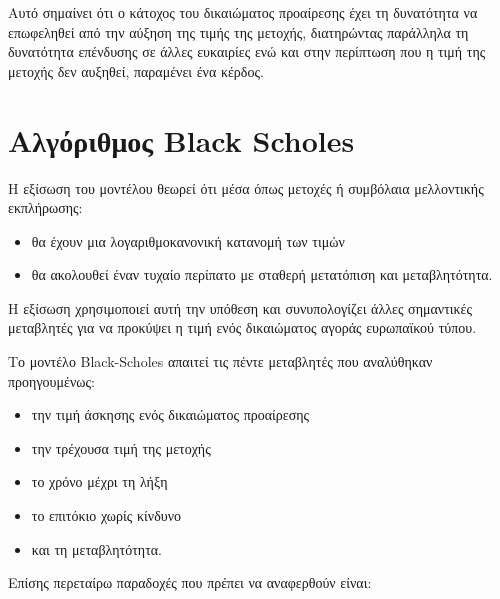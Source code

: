 Αυτό σημαίνει ότι ο κάτοχος του δικαιώματος προαίρεσης έχει τη δυνατότητα να επωφεληθεί από την αύξηση της τιμής της μετοχής, διατηρώντας παράλληλα τη δυνατότητα επένδυσης σε άλλες ευκαιρίες
ενώ και στην περίπτωση που η τιμή της μετοχής δεν αυξηθεί, παραμένει ένα κέρδος.

\section{Αλγόριθμος Black Scholes}

H εξίσωση του μοντέλου θεωρεί ότι μέσα όπως μετοχές ή συμβόλαια μελλοντικής εκπλήρωσης:
\begin{itemize}
    \item θα έχουν μια λογαριθμοκανονική κατανομή των τιμών
    \item θα ακολουθεί έναν τυχαίο περίπατο με σταθερή μετατόπιση και μεταβλητότητα.
\end{itemize}

Η εξίσωση χρησιμοποιεί αυτή την υπόθεση και συνυπολογίζει άλλες σημαντικές μεταβλητές για να προκύψει η τιμή ενός δικαιώματος αγοράς ευρωπαϊκού τύπου.

Το μοντέλο Black-Scholes απαιτεί τις πέντε μεταβλητές που αναλύθηκαν προηγουμένως:
\begin{itemize}
    \item την τιμή άσκησης ενός δικαιώματος προαίρεσης
    \item την τρέχουσα τιμή της μετοχής
    \item το χρόνο μέχρι τη λήξη
    \item το επιτόκιο χωρίς κίνδυνο
    \item και τη μεταβλητότητα.
\end{itemize}

Επίσης περεταίρω παραδοχές που πρέπει να αναφερθούν είναι:

